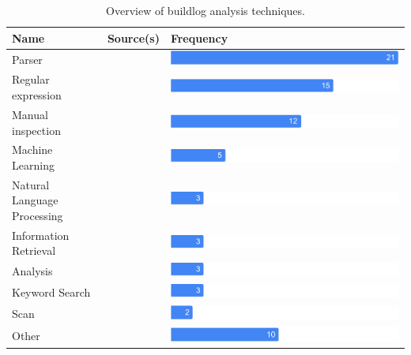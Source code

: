 \begin{table}[]
\centering
\caption{Overview of buildlog analysis techniques.}
\begin{tabularx}{\textwidth}{@{}lXX@{}}
\toprule
Name			     & Source(s)	& Frequency	  \\
\midrule
Parser	& &
\includegraphics[width=0.55\columnwidth]{img/lit-sur/techniques-no-guidelines-cropped_21.pdf}
\\
Regular expression  & &
\includegraphics[width=0.55\columnwidth]{img/lit-sur/techniques-no-guidelines-cropped_15.pdf}
\\
Manual inspection  & &
\includegraphics[width=0.55\columnwidth]{img/lit-sur/techniques-no-guidelines-cropped_12.pdf}
\\
Machine Learning  & &
\includegraphics[width=0.55\columnwidth]{img/lit-sur/techniques-no-guidelines-cropped_5.pdf}
\\
Natural Language Processing  & &
\includegraphics[width=0.55\columnwidth]{img/lit-sur/techniques-no-guidelines-cropped_3.pdf}
\\
Information Retrieval  & &
\includegraphics[width=0.55\columnwidth]{img/lit-sur/techniques-no-guidelines-cropped_3.pdf}
\\
Analysis  & &
\includegraphics[width=0.55\columnwidth]{img/lit-sur/techniques-no-guidelines-cropped_3.pdf}
\\
Keyword Search	& &
\includegraphics[width=0.55\columnwidth]{img/lit-sur/techniques-no-guidelines-cropped_3.pdf}
\\
Scan  & &
\includegraphics[width=0.55\columnwidth]{img/lit-sur/techniques-no-guidelines-cropped_2.pdf}
\\
Other  & &
\includegraphics[width=0.55\columnwidth]{img/lit-sur/techniques-no-guidelines-cropped_10.pdf}
\\
\bottomrule
\end{tabularx}
\label{tab:obat}
\end{table}


